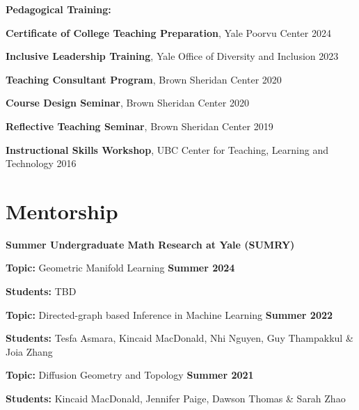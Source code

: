 \documentclass[margin,line]{res}
\newenvironment{list1}{
  \begin{list}{\ding{113}}{
      \setlength{\itemsep}{0in}
      \setlength{\parsep}{0in} \setlength{\parskip}{0in}
      \setlength{\topsep}{0in} \setlength{\partopsep}{0in}
      \setlength{\leftmargin}{0.17in}}}{\end{list}}
\begin{document}
\begin{resume}
\textbf{Pedagogical Training:}
\vspace*{.2cm}

\begin{list1}
\setlength\itemsep{0.25em}
\item[] {\bf Certificate of College Teaching Preparation}, Yale Poorvu Center \hfill 2024
\item[] {\bf Inclusive Leadership Training}, Yale Office of Diversity and Inclusion \hfill 2023
\item[] {\bf Teaching Consultant Program}, Brown Sheridan Center \hfill 2020
\item[] {\bf Course Design Seminar}, Brown Sheridan Center \hfill 2020
\item[] {\bf Reflective Teaching Seminar}, Brown Sheridan Center \hfill 2019
\item[] {\bf Instructional Skills Workshop}, UBC Center for Teaching, Learning and Technology \hfill 2016
\end{list1} 

\section{\sc Mentorship}

{\bf Summer Undergraduate Math Research at Yale (SUMRY)}
\vspace*{.3cm}
\begin{list1}
\setlength\itemsep{0.2em}
\item[] {\bf Topic:} Geometric Manifold Learning \hfill {\bf \small Summer 2024}
\item[] {\bf Students:} TBD 
\end{list1}
\vspace*{.3cm}
\begin{list1}
\setlength\itemsep{0.2em}
\item[] {\bf Topic:} Directed-graph based Inference in Machine Learning \hfill {\bf \small Summer 2022}
\item[] {\bf Students:} Tesfa Asmara, Kincaid MacDonald, Nhi Nguyen, Guy Thampakkul \& Joia Zhang 
\end{list1}
\vspace*{.3cm}
\begin{list1}
\setlength\itemsep{0.2em}
\item[] {\bf Topic:} Diffusion Geometry and Topology \hfill {\bf \small Summer 2021}
\item[] {\bf Students:} Kincaid MacDonald, Jennifer Paige, Dawson Thomas \& Sarah Zhao
\end{list1}


\end{resume}
\end{document}
